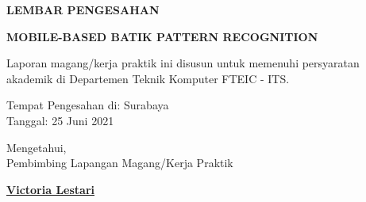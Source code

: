 \begin{center}
  {\Large \textbf{LEMBAR PENGESAHAN}}
  \vspace{6ex}


  {\large \textbf{MOBILE-BASED BATIK PATTERN RECOGNITION}}
  \vspace{6ex}

  Laporan magang/kerja praktik ini disusun untuk memenuhi persyaratan akademik di Departemen Teknik Komputer FTEIC - ITS.
  \vspace{2ex}

  Tempat Pengesahan di: Surabaya \\
  Tanggal: 25 Juni 2021
  \vspace{8ex}

  Mengetahui, \\
  Pembimbing Lapangan Magang/Kerja Praktik
  \vspace{12ex}

  \textbf{\underline{Victoria Lestari}}
  \vspace{8ex}



\end{center}